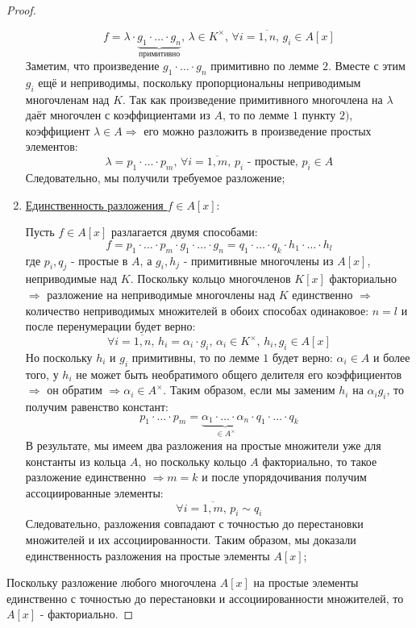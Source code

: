 \documentclass[12pt]{article}
\theoremstyle{definition}
\newcommand{\ovl}[1]{\overline{#1}}
\begin{document}
\begin{proof}
\begin{enumerate}[label=\arabic*)]
		$$
			f = \lambda{\cdot}\underbrace{g_1{\cdot}\dotsc{\cdot}g_n}_{\text{примитивно}}, \, \lambda \in K^{\times}, \, \forall i =\ovl{1,n}, \, g_i \in A[x]
		$$
		Заметим, что произведение $g_1{\cdot}\dotsc{\cdot}g_n$ примитивно по лемме $2$. Вместе с этим $g_i$ ещё и неприводимы, поскольку пропорциональны неприводимым многочленам над $K$. Так как произведение примитивного многочлена на $\lambda$ даёт многочлен с коэффициентами из $A$, то по лемме $1$ пункту $2)$, коэффициент $\lambda \in A \Rightarrow$ его можно разложить в произведение простых элементов:
		$$
			\lambda = p_1{\cdot}\dotsc{\cdot}p_m, \, \forall i =\ovl{1,m}, \, p_i \text{ - простые},\, p_i \in A
		$$
		Следовательно, мы получили требуемое разложение;
		\item \uline{Единственность разложения $f \in A[x]$}:

		Пусть $f \in A[x]$ разлагается двумя способами:
		$$
			f = p_1{\cdot}\dotsc{\cdot}p_m{\cdot}g_1{\cdot}\dotsc{\cdot}g_n = q_1{\cdot}\dotsc{\cdot}q_k{\cdot}h_1{\cdot}\dotsc{\cdot}h_l
		$$
		где $p_i, q_j$ - простые в $A$, а $g_i, h_j$ - примитивные многочлены из $A[x]$, неприводимые над $K$. Поскольку кольцо многочленов $K[x]$ факториально $\Rightarrow$ разложение на неприводимые многочлены над $K$ единственно $\Rightarrow$ количество неприводимых множителей в обоих способах одинаковое: $n = l$ и после перенумерации будет верно: 
		$$
			\forall i = \ovl{1,n}, \, h_i = \alpha_i{\cdot}g_i, \,  \alpha_i \in K^{\times}, \, h_i, g_i \in A[x]
		$$ 
		Но поскольку $h_i$ и $g_i$ примитивны, то по лемме $1$ будет верно: $\alpha_i \in A$ и более того, у $h_i$ не может быть необратимого общего делителя его коэффициентов $\Rightarrow$ он обратим $\Rightarrow \alpha_i \in A^{\times}$. Таким образом, если мы заменим $h_i$ на $\alpha_ig_i$, то получим равенство констант:
		$$
			p_1{\cdot}\dotsc{\cdot}p_m = \underbrace{\alpha_1{\cdot}\dotsc{\cdot}\alpha_n}_{\in A^\times}{\cdot}q_1{\cdot}\dotsc{\cdot}q_k
		$$
		В результате, мы имеем два разложения на простые множители уже для константы из кольца $A$, но поскольку кольцо $A$ факториально, то такое разложение единственно $\Rightarrow m = k$ и после упорядочивания получим ассоциированные элементы: 
		$$
			\forall i = \ovl{1,m}, \, p_i \sim q_i  
		$$ 
		Следовательно, разложения совпадают с точностью до перестановки множителей и их ассоциированности. Таким образом, мы доказали единственность разложения на простые элементы $A[x]$;
	\end{enumerate}
	Поскольку разложение любого многочлена $A[x]$ на простые элементы единственно с точностью до перестановки и ассоциированности множителей, то $A[x]$ - факториально.
\end{proof}
\end{document}
